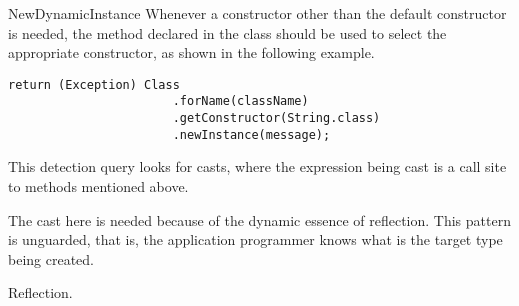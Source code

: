 \begin{pattern}{NewDynamicInstance}
Whenever a constructor other than the default constructor is needed,
the  method declared in the  class
should be used to select the appropriate constructor,
as shown in the following example.

\begin{lstlisting}[style=java,caption=Example of the \pname{} pattern using the \code{Constructor} class.]
return (Exception) Class
                       .forName(className)
                       .getConstructor(String.class)
                       .newInstance(message);
\end{lstlisting}

\detection{}
This detection query looks for casts,
where the expression being cast is a call site to methods mentioned above.

\discussion{}
The cast here is needed because of the dynamic essence of reflection.
This pattern is unguarded, that is,
the application programmer knows what is the target type being created.

\related{}
Reflection.

\end{pattern}